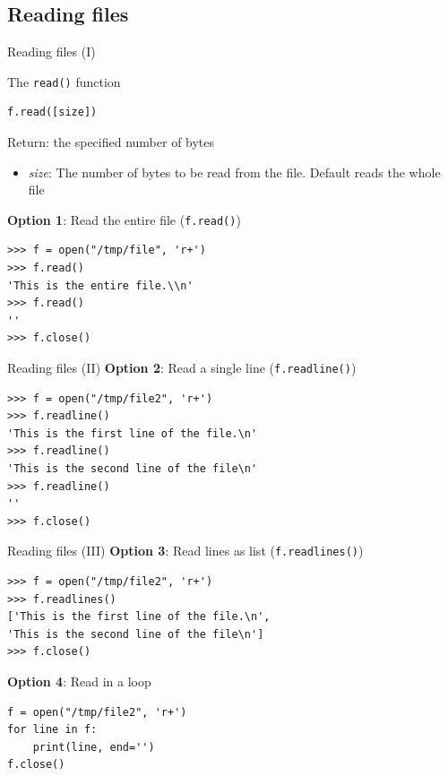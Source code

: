 \documentclass[10pt,compress]{beamer} %
\begin{document}
\subsection{Reading files}
\begin{frame}[fragile]{Reading files (I)}
	\begin{block}{The \texttt{read()} function}
	\vspace{-0.2cm}
\begin{verbatim}
f.read([size])
\end{verbatim}

	\vspace{-0.2cm}
	Return: the specified number of bytes
	\begin{itemize}
	\item \textit{size}: The number of bytes to be read from the file. Default reads the whole file
	\end{itemize}
	\end{block}
\textbf{Option 1}: Read the entire file (\texttt{f.read()})
\begin{verbatim}
>>> f = open("/tmp/file", 'r+')
>>> f.read()
'This is the entire file.\\n'
>>> f.read()
''
>>> f.close()
\end{verbatim}
	
\end{frame}

\begin{frame}[fragile]{Reading files (II)}
	\textbf{Option 2}: Read a single line (\texttt{f.readline()})
\begin{verbatim}
>>> f = open("/tmp/file2", 'r+')
>>> f.readline()
'This is the first line of the file.\n'
>>> f.readline()
'This is the second line of the file\n'
>>> f.readline()
''
>>> f.close()
\end{verbatim}

\end{frame}

\begin{frame}[fragile]{Reading files (III)}
	\textbf{Option 3}: Read lines as list (\texttt{f.readlines()})
\begin{verbatim}
>>> f = open("/tmp/file2", 'r+')
>>> f.readlines()
['This is the first line of the file.\n',
'This is the second line of the file\n']
>>> f.close()
\end{verbatim}

	\textbf{Option 4}: Read in a loop
\begin{verbatim}
f = open("/tmp/file2", 'r+')
for line in f:
    print(line, end='')
f.close()
\end{verbatim}
\end{frame}
\end{document}
